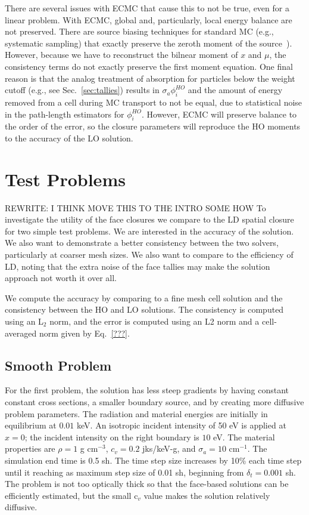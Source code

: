   There are
several issues with ECMC that cause this to not be true, even for a linear problem.
With ECMC, global and, particularly, local energy balance are not preserved.  There
are source biasing techniques for standard MC (e.g., systematic
sampling) that exactly preserve the zeroth moment of the
source~\cite{shultis_mc,wollaber_review}). 
However, because we have to reconstruct the bilnear moment
of $x$ and $\mu$, the consistency terms do not exactly preserve the first moment
equation.  One final reason is that the analog treatment of absorption for particles below
the weight cutoff (e.g., see Sec.~\ref{sec:tallies}) results in $\sigma_a \phi^{HO}_i$ and the amount
of energy removed from a cell during MC transport to not be equal, due to statistical noise in the
path-length estimators for $\phi^{HO}_i$.  However, ECMC will preserve
balance to the order of the error, so the closure parameters will
reproduce the HO moments to the accuracy of the LO solution.

\section{Test Problems}

REWRITE: I THINK MOVE THIS TO THE INTRO SOME HOW
To investigate the utility of the face closures we compare to the LD spatial
closure for two simple test problems.  We are interested in the accuracy of the solution. 
We also want to demonstrate a better consistency between the two solvers, particularly at
coarser mesh sizes.  We also want to compare to the efficiency of LD, noting that the
extra noise of the face tallies may make the solution approach not worth it over all.

We compute the accuracy by comparing to a fine mesh cell solution and the consistency between the HO and LO solutions.
The consistency is computed using an L$_2$ norm, and the error is computed using an L2 norm and a cell-averaged norm
given by Eq.~\eqref{???}.

\subsection{Smooth Problem}

For the first problem, the solution has less steep gradients by having constant constant cross
sections, a smaller boundary source, and by creating more diffusive problem parameters.
The radiation and material energies are initially in
equilibrium at $0.01$ keV.   An isotropic incident intensity of 50 eV is applied
at $x=0$; the incident intensity on the right boundary is $10$ eV.
The material properties are $\rho = 1$ g cm$^{-3}$, $c_v = 0.2$ jks/keV-g, and
$\sigma_a=10$ cm$^{-1}$.
The simulation end time is 0.5 sh.  The time step size increases by 10\% each time step
until it reaching as maximum step size of 0.01 sh, beginning from $\delta_t = 0.001$ sh.
The problem is not too optically thick so that the face-based solutions can be efficiently
estimated, but the small c$_v$ value makes the solution relatively diffusive.  

